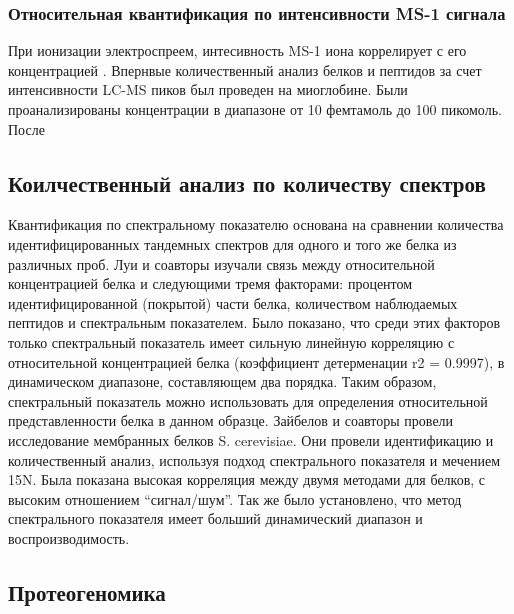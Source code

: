 \subsubsection{Относительная квантификация по интенсивности MS-1 сигнала}
При ионизации электроспреем, интесивность MS-1 иона коррелирует с его концентрацией \cite{voyksner1999investigating}. 
Впернвые количественный анализ белков и пептидов за счет интенсивности LC-MS пиков был проведен на миоглобине. Были проанализированы концентрации в диапазоне от 10 фемтамоль до 100 пикомоль.
После 

\subsection{Коилчественный анализ по количеству спектров}
Квантификация по спектральному показателю основана на сравнении количества идентифицированных тандемных спектров для одного и того же белка из различных проб. Луи и соавторы изучали связь между относительной концентрацией белка и следующими тремя факторами: процентом идентифицированной (покрытой) части белка, количеством наблюдаемых пептидов и спектральным показателем. Было показано, что среди этих факторов только спектральный показатель имеет сильную линейную корреляцию с относительной концентрацией белка (коэффициент детерменации r2 = 0.9997), в динамическом диапазоне, составляющем два порядка. Таким образом, спектральный показатель можно использовать для определения относительной представленности белка в данном образце. Зайбелов и соавторы провели исследование мембранных белков S. cerevisiae. Они провели идентификацию и количественный анализ, используя подход спектрального показателя и мечением 15N. Была показана высокая корреляция между двумя методами для белков, с высоким отношением “сигнал/шум”. Так же было установлено, что метод спектрального показателя имеет больший  динамический диапазон и воспроизводимость.

\subsection{Протеогеномика}
\newpage

